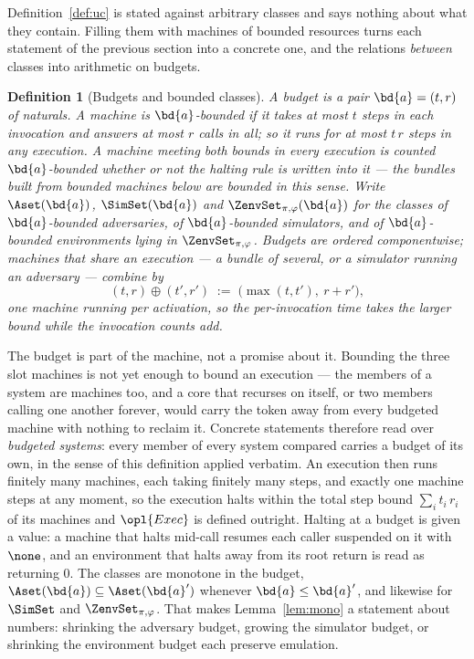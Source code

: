 \documentclass[10pt,oneside,openany]{book}
\theoremstyle{accentdef}
\newtheorem{definition}{Definition}[chapter]
\theoremstyle{accentplain}
\begin{document}
Definition~\ref{def:uc} is stated against arbitrary classes and says nothing about what they
contain. Filling them with machines of bounded resources turns each statement of the previous
section into a concrete one, and the relations \emph{between} classes into arithmetic on budgets.

\begin{definition}[Budgets and bounded classes]\label{def:res}
A \emph{budget} is a pair $\bd{a} = (t,r)$ of naturals. A machine is \emph{$\bd{a}$-bounded} if
it takes at most $t$ steps in each invocation and answers at most $r$ calls in all; so it runs
for at most $t\,r$ steps in any execution. A machine meeting both bounds in every execution is
counted $\bd{a}$-bounded whether or not the halting rule is written into it --- the bundles built
from bounded machines below are bounded in this sense. Write
$\Aset(\bd{a})$, $\SimSet(\bd{a})$ and $\ZenvSet_{\pi,\varphi}(\bd{a})$ for the classes of
$\bd{a}$-bounded adversaries, of $\bd{a}$-bounded simulators, and of $\bd{a}$-bounded
environments lying in $\ZenvSet_{\pi,\varphi}$. Budgets are ordered componentwise; machines that
share an execution --- a bundle of several, or a simulator running an adversary --- combine by
\[
  (t,r) \oplus (t',r') \;:=\; \bigl(\max(t,t'),\ r + r'\bigr) ,
\]
one machine running per activation, so the per-invocation time takes the larger bound while the
invocation counts add.
\end{definition}

The budget is part of the machine, not a promise about it. Bounding the three slot machines is
not yet enough to bound an execution --- the members of a system are machines too, and a core
that recurses on itself, or two members calling one another forever, would carry the token away
from every budgeted machine with nothing to reclaim it. Concrete statements therefore read over
\emph{budgeted systems}: every member of every system compared carries a budget of its own, in
the sense of this definition applied verbatim. An execution then runs finitely many machines,
each taking finitely many steps, and exactly one machine steps at any moment, so the execution
halts within the total step bound $\sum_i t_i\,r_i$ of its machines and $\opl{Exec}$ is defined outright. Halting at a budget is
given a value: a machine that halts mid-call resumes each caller suspended on it with $\none$,
and an environment that halts away from its root return is read as returning $0$. The classes are monotone in the budget,
$\Aset(\bd{a}) \subseteq \Aset(\bd{a}')$ whenever $\bd{a} \leq \bd{a}'$, and likewise for
$\SimSet$ and $\ZenvSet_{\pi,\varphi}$. That makes Lemma~\ref{lem:mono} a statement about numbers:
shrinking the adversary budget, growing the simulator budget, or shrinking the environment budget
each preserve emulation.
\end{document}
